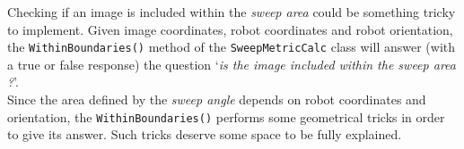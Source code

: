 Checking if an image is included within the \textit{sweep area}
could be something tricky to implement. Given image coordinates, 
robot coordinates and robot orientation, the \texttt{WithinBoundaries()} 
method of the \texttt{SweepMetricCalc} class 
will answer (with a true or false response) the question
`\textit{is the image included within the sweep area ?}'.
\\
Since the area defined by the \textit{sweep angle} depends on robot 
coordinates and orientation, the \texttt{WithinBoundaries()}
performs some geometrical tricks in order to give its answer. 
Such tricks deserve some space to be fully explained.
\begin{figure}[htp]
  \begin{center}
    \hspace*{15pt}


\end{center}
\end{figure}
